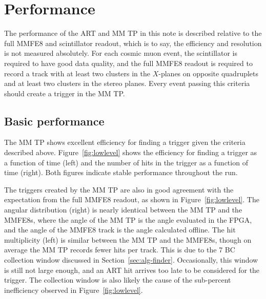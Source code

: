 \section{Performance}
\label{sec:perf}

The performance of the ART and MM TP in this note is described relative to the full MMFE8 and scintillator readout, which is to say, the efficiency and resolution is not measured absolutely. For each cosmic muon event, the scintillator is required to have good data quality, and the full MMFE8 readout is required to record a track with at least two clusters in the $X$-planes on opposite quadruplets and at least two clusters in the stereo planes. Every event passing this criteria should create a trigger in the MM TP.

\subsection{Basic performance}
\label{sec:perf-basic}

The MM TP shows excellent efficiency for finding a trigger given the criteria described above. Figure~\ref{fig:lowlevel} shows the efficiency for finding a trigger as a function of time (left) and the number of hits in the trigger as a function of time (right). Both figures indicate stable performance throughout the run.

The triggers created by the MM TP are also in good agreement with the expectation from the full MMFE8 readout, as shown in Figure~\ref{fig:lowlevel}. The angular distribution (right) is nearly identical between the MM TP and the MMFE8s, where the angle of the MM TP is the angle evaluated in the FPGA, and the angle of the MMFE8 track is the angle calculated offline. The hit multiplicity (left) is similar between the MM TP and the MMFE8s, though on average the MM TP records fewer hits per track. This is due to the 7 BC collection window discussed in Section~\ref{sec:alg-finder}. Occasionally, this window is still not large enough, and an ART hit arrives too late to be considered for the trigger. The collection window is also likely the cause of the sub-percent inefficiency observed in Figure~\ref{fig:lowlevel}.

